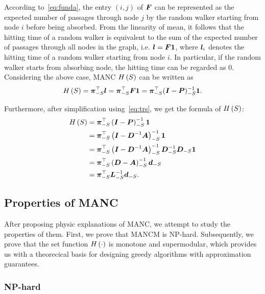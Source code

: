 \documentclass[sigconf]{acmart}
\begin{document}
According to~\eqref{eq:funda}, the entry \((i,j)\) of \(\boldsymbol{F}\) can be represented as the expected number of passages through node \(j\) by the random walker starting from node \(i\) before being absorbed.
From the linearity of mean, it follows that the hitting time of a random walker is equivalent to the sum of the expected number of passages through all nodes in the graph, i.e. \(\boldsymbol{l}=\boldsymbol{F}\boldsymbol{1}\), where \(\boldsymbol{l}_i\) denotes the hitting time of a random walker starting from node \(i\).
In particular, if the random walker starts from absorbing node, the hitting time can be regarded as \(0\).
Considering the above case, MANC \(H\left(S\right)\) can be written as
\[H\left(S\right)=\boldsymbol{\pi}_{-S}^\top\boldsymbol{l}=\boldsymbol{\pi}_{-S}^\top\boldsymbol{F}\boldsymbol{1}=\boldsymbol{\pi}_{-S}^\top(\boldsymbol{I}-\boldsymbol{P})_{-S}^{-1}\boldsymbol{1}.\]

Furthermore, after simplification using~\eqref{eq:trs}, we get the formula of \(H\left(S\right)\):
\begin{equation}\label{eq:MANC}
    \begin{split}
        H\left(S\right) & =\boldsymbol{\pi}_{-S}^\top\left( \boldsymbol{I}-\boldsymbol{P} \right)_{-S}^{-1}\boldsymbol{1}                                    \\
        & =\boldsymbol{\pi}_{-S}^\top\left( \boldsymbol{I}-\boldsymbol{D}^{-1}\boldsymbol{A} \right)_{-S}^{-1}\boldsymbol{1}                          \\
        & =\boldsymbol{\pi}_{-S}^\top\left( \boldsymbol{I}-\boldsymbol{D}^{-1}\boldsymbol{A} \right)_{-S}^{-1}\boldsymbol{D}_{-S}^{-1}\boldsymbol{D}_{-S}\boldsymbol{1} \\
        & =\boldsymbol{\pi}_{-S}^\top\left( \boldsymbol{D}-\boldsymbol{A} \right)_{-S}^{-1}\boldsymbol{d}_{-S}                                \\
        & =\boldsymbol{\pi}_{-S}^\top\boldsymbol{L}_{-S}^{-1}\boldsymbol{d}_{-S}.
    \end{split}
\end{equation}

\subsection{Properties of MANC}

After proposing physic explanations of MANC, we attempt to study the properties of them. First, we prove that MANCM is NP-hard.
Subsequently, we prove that the set function \(H\left(\cdot\right)\) is monotone and supermodular, which provides us with a theorecical basis for designing greedy algorithms with approximation guarantees.

\subsubsection{NP-hard}
\end{document}
